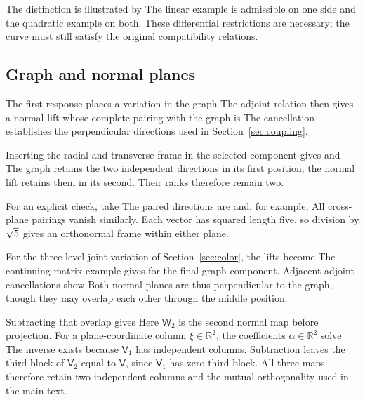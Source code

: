 The distinction is illustrated by
\DifferentiationContactExamplesDisplay
The linear example is admissible on one side and the quadratic example on both. These differential restrictions are necessary; the curve must still satisfy the original compatibility relations.

\subsection{Graph and normal planes}
The first response places a variation in the graph
\FieldCouplingGraphDisplay
The adjoint relation
\FieldCouplingAdjointDisplay
then gives a normal lift
\FieldCouplingNormalDisplay
whose complete pairing with the graph is
\FieldCouplingOrthogonalityDisplay
The cancellation establishes the perpendicular directions used in Section~\ref{sec:coupling}.

Inserting the radial and transverse frame in the selected component gives
\FieldCouplingGraphPlaneDisplay
and
\FieldCouplingNormalPlaneDisplay
The graph retains the two independent directions in its first position; the normal lift retains them in its second. Their ranks therefore remain two.

For an explicit check, take
\FieldCouplingExampleDerivativeDisplay
The paired directions are
\FieldCouplingExampleLiftsDisplay
and, for example,
\FieldCouplingExampleCancellationDisplay
All cross-plane pairings vanish similarly. Each vector has squared length five, so division by $\sqrt5$ gives an orthonormal frame within either plane.

For the three-level joint variation of Section~\ref{sec:color}, the lifts become
\AlgebraTripleLiftDisplay
The continuing matrix example gives
\AlgebraResponseExampleDisplay
for the final graph component. Adjacent adjoint cancellations show
\AlgebraNormalCancellationDisplay
Both normal planes are thus perpendicular to the graph, though they may overlap each other through the middle position.

Subtracting that overlap gives
\AlgebraOrthogonalColumnsDisplay
Here $\mathsf W_2$ is the second normal map before projection. For a plane-coordinate column $\xi\in\mathbb R^2$, the coefficients $\alpha\in\mathbb R^2$ solve
\AlgebraProjectionDisplay
The inverse exists because $\mathsf V_1$ has independent columns. Subtraction leaves the third block of $\mathsf V_2$ equal to $\mathsf V$, since $\mathsf V_1$ has zero third block. All three maps therefore retain two independent columns and the mutual orthogonality used in the main text.

